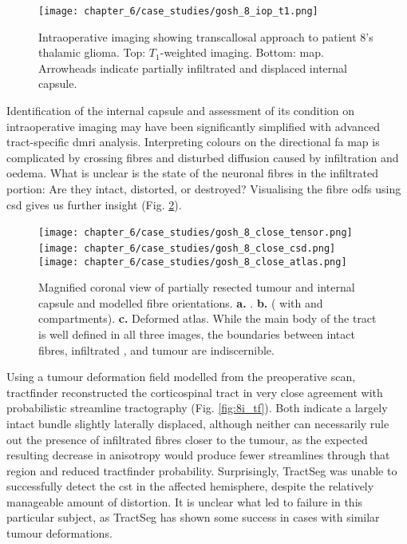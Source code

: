 \begin{figure}
  \centering
  \texttt{[image: chapter\_6/case\_studies/gosh\_8\_iop\_t1.png]}
  
  \caption[GOSH iMRI patient 8, intraoperative imaging]{Intraoperative imaging showing transcallosal approach to patient 8's thalamic glioma. Top: $T_1$-weighted imaging. Bottom:    map. Arrowheads indicate partially infiltrated and displaced internal capsule.}
  \label{fig:8i}
\end{figure}

Identification of the internal capsule and assessment of its condition on intraoperative imaging may have been significantly simplified with advanced tract-specific \gls{dmri} analysis.
Interpreting colours on the directional \gls{fa} map is complicated by crossing fibres and disturbed diffusion caused by infiltration and oedema.
What is unclear is the state of the neuronal fibres in the infiltrated portion: Are they intact, distorted, or destroyed?
Visualising the fibre \glspl{odf} using \gls{csd} gives us further insight (Fig. \ref{fig:8i_fod}).

\begin{figure}
  \centering
  \texttt{[image: chapter\_6/case\_studies/gosh\_8\_close\_tensor.png]}\,%
  \texttt{[image: chapter\_6/case\_studies/gosh\_8\_close\_csd.png]}\,%
  \texttt{[image: chapter\_6/case\_studies/gosh\_8\_close\_atlas.png]}
  \caption[GOSH iMRI patient 8, intraoperative imaging, internal capsule detail]{Magnified coronal view of partially resected tumour and internal capsule and modelled fibre orientations.
  \textbf{\sffamily a.} .
  \textbf{\sffamily b.}   (  with  and  compartments).
  \textbf{\sffamily c.} Deformed   atlas. While the main body of the tract is well defined in all three images, the boundaries between intact fibres, infiltrated , and tumour are indiscernible.}
  \label{fig:8i_fod}
\end{figure}

Using a tumour deformation field modelled from the preoperative scan, tractfinder reconstructed the corticospinal tract in very close agreement with probabilistic streamline tractography (Fig. \ref{fig:8i_tf}).
Both indicate a largely intact bundle slightly laterally displaced, although neither can necessarily rule out the presence of infiltrated fibres closer to the tumour, as the expected resulting decrease in anisotropy would produce fewer streamlines through that region and reduced tractfinder probability.
Surprisingly, TractSeg was unable to successfully detect the \gls{cst} in the affected hemisphere, despite the relatively manageable amount of distortion.
It is unclear what led to failure in this particular subject, as TractSeg has shown some success in cases with similar tumour deformations\autocite{Moshe2022}.

